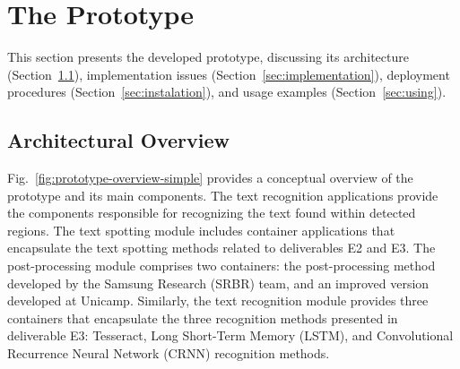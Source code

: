 
\section{The Prototype}
\label{sec:overview}

This section presents the developed prototype, discussing its architecture (Section~\ref{sec:architecture}), implementation issues (Section~\ref{sec:implementation}), deployment procedures (Section~\ref{sec:instalation}), and usage examples (Section~\ref{sec:using}).

\subsection{Architectural Overview}
\label{sec:architecture}

Fig.~\ref{fig:prototype-overview-simple} provides a conceptual overview of the prototype and its main components.
The text recognition applications provide the components responsible for recognizing the text found within detected regions. The text spotting module includes container applications that encapsulate the text spotting methods related to deliverables E2 and E3. The post-processing module comprises two containers: the post-processing method developed by the Samsung Research (SRBR) team, and an improved version developed at Unicamp. Similarly, the text recognition module provides three containers that encapsulate the three recognition methods presented in deliverable E3: Tesseract, Long Short-Term Memory (LSTM), and Convolutional Recurrence Neural Network (CRNN) recognition methods.

